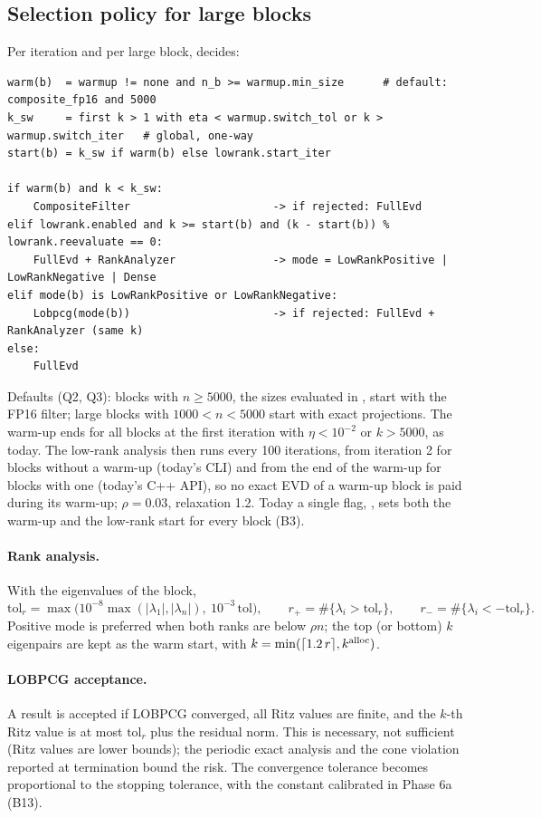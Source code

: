 \documentclass[11pt]{article}
\begin{document}
\subsection{Selection policy for large blocks}\label{sec:selection}
Per iteration and per large block,  decides:
\begin{lstlisting}[style=plain]
warm(b)  = warmup != none and n_b >= warmup.min_size      # default: composite_fp16 and 5000
k_sw     = first k > 1 with eta < warmup.switch_tol or k > warmup.switch_iter   # global, one-way
start(b) = k_sw if warm(b) else lowrank.start_iter

if warm(b) and k < k_sw:
    CompositeFilter                      -> if rejected: FullEvd
elif lowrank.enabled and k >= start(b) and (k - start(b)) % lowrank.reevaluate == 0:
    FullEvd + RankAnalyzer               -> mode = LowRankPositive | LowRankNegative | Dense
elif mode(b) is LowRankPositive or LowRankNegative:
    Lobpcg(mode(b))                      -> if rejected: FullEvd + RankAnalyzer (same k)
else:
    FullEvd
\end{lstlisting}
Defaults (Q2, Q3): blocks with $n\ge5000$, the sizes evaluated in \cite{composite}, start with the FP16 filter;
large blocks with $1000<n<5000$ start with exact projections. The warm-up ends for all blocks at the first
iteration with $\eta<10^{-2}$ or $k>5000$, as today. The low-rank analysis then runs every 100 iterations,
from iteration 2 for blocks without a warm-up (today's CLI) and from the end of the warm-up for blocks with one
(today's C++ API), so no exact EVD of a warm-up block is paid during its warm-up; $\rho = 0.03$, relaxation
1.2. Today a single flag, , sets both the warm-up and the low-rank start for every
block (B3).

\paragraph{Rank analysis.} With the eigenvalues of the block,
\[
\text{tol}_r = \max\big(10^{-8}\max(|\lambda_1|,|\lambda_n|),\ 10^{-3}\,\text{tol}\big),\qquad
r_+ = \#\{\lambda_i>\text{tol}_r\},\qquad r_- = \#\{\lambda_i<-\text{tol}_r\}.
\]
Positive mode is preferred when both ranks are below $\rho n$; the top (or bottom) $k$ eigenpairs are kept as
the warm start, with $k = \min(\lceil1.2\,r\rceil, k^{\rm alloc})$.

\paragraph{LOBPCG acceptance.} A result is accepted if LOBPCG converged, all Ritz values are finite, and the
$k$-th Ritz value is at most $\text{tol}_r$ plus the residual norm. This is necessary, not sufficient (Ritz
values are lower bounds); the periodic exact analysis and the cone violation reported at termination bound
the risk. The convergence tolerance becomes proportional to the stopping tolerance, with the constant
calibrated in Phase 6a (B13).
\end{document}
